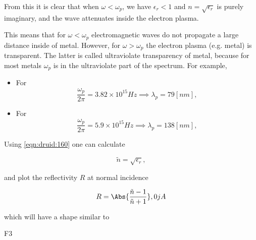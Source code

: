 From this it is clear that when \( \omega < \omega_p \), we have \( \epsilon_r < 1 \) and \( n = \sqrt{\epsilon_r} \) is purely imaginary, and the wave attenuates inside the electron plasma.

This means that for \( \omega < \omega_p \) electromagnetic waves do not propagate a large distance inside of metal.  However, for \( \omega > \omega_p \) the electron plasma (e.g. metal) is transparent.  The latter is called ultraviolate transparency of metal, because for most metals \( \omega_p \) is in the ultraviolate part of the spectrum.  For example, 

\begin{itemize}
\item For 
\begin{dmath}\label{eqn:druid:180}
\frac{\omega_p}{2 \pi} = 3.82 \times 10^{15} \si{Hz} \implies \lambda_p = 79 [nm],
\end{dmath}
\item For 
\begin{dmath}\label{eqn:druid:200}
\frac{\omega_p}{2 \pi} = 5.9 \times 10^{15} \si{Hz} \implies \lambda_p = 138 [nm],
\end{dmath}
\end{itemize}

Using \cref{eqn:druid:160} one can calculate 

\begin{dmath}\label{eqn:druid:220}
\tilde{n} = \sqrt{\epsilon_r},
\end{dmath}

and plot the reflectivity \( R \) at normal incidence

\begin{dmath}\label{eqn:druid:240}
R = \Abs{ \frac{\tilde{n} - 1 }{\tilde{n} + 1} },0jA
\end{dmath}

which will have a shape similar to

F3
